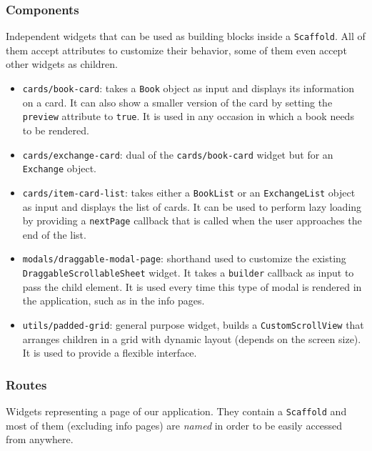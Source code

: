 \subsubsection{Components}
Independent widgets that can be used as building blocks inside a \texttt{Scaffold}.
All of them accept attributes to customize their behavior, some of them even accept other widgets as children.

\begin{itemize}
      \item \texttt{cards/book-card}:
            takes a \texttt{Book} object as input and displays its information on a card.
            It can also show a smaller version of the card by setting the \texttt{preview} attribute to \texttt{true}.
            It is used in any occasion in which a book needs to be rendered.
      \item \texttt{cards/exchange-card}:
            dual of the \texttt{cards/book-card} widget but for an \texttt{Exchange} object.
      \item \texttt{cards/item-card-list}:
            takes either a \texttt{BookList} or an \texttt{ExchangeList} object as input and displays the list of cards.
            It can be used to perform lazy loading by providing a \texttt{nextPage} callback that is called when the user
            approaches the end of the list.
      \item \texttt{modals/draggable-modal-page}:
            shorthand used to customize the existing \texttt{DraggableScrollableSheet} widget.
            It takes a \texttt{builder} callback as input to pass the child element.
            It is used every time this type of modal is rendered in the application, such as in the info pages.
      \item \texttt{utils/padded-grid}:
            general purpose widget, builds a \texttt{CustomScrollView} that arranges children in a grid with
            dynamic layout (depends on the screen size). It is used to provide a flexible interface.
\end{itemize}

\subsubsection{Routes}
Widgets representing a page of our application.
They contain a \texttt{Scaffold} and most of them (excluding info pages) are \emph{named} in order to be easily accessed from anywhere.


